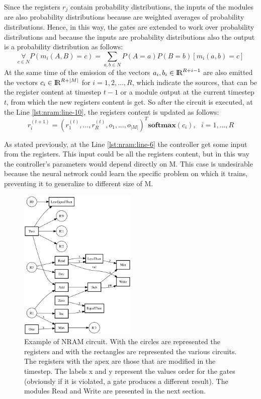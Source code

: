 Since the registers $r_j$ contain probability distributions, the inputs of the modules are also probability distributions because are weighted averages of probability distributions. Hence, in this way, the gates are extended to work over probability distributions and because the inputs are probability distributions also the output is a probability distribution as follows:
\begin{equation}
	\mathop{\forall}\limits_{c \in N} P(m_i(A, B) = c) = \sum\limits_{a,b \in N} P(A = a)P(B = b)[m_i(a, b) = c]
\end{equation}
At the same time of the emission of the vectors $a_{i}, b_{i} \in \textrm{I\!R}^{R+i-1}$ are also emitted the vectors $c_i \in \textrm{I\!R}^{R+|M|}$ for $i = 1, 2, \dots, R$, which indicate the sources, that can be the register content at timestep $t-1$ or a module output at the current timestep $t$, from which the new registers content is get. So after the circuit is executed, at the Line \ref{lst:nram:line-10}, the registers content is updated as follows:
\begin{equation}
	r_i^{(t + 1)} = (r_1^{(t)}, \dots, r_R^{(t)}, o_1, \dots, o_{|M|})^T\textbf{softmax}(c_i),\ \ \ i = 1,\dots,R
\end{equation}

As stated previously, at the Line \ref{lst:nram:line-6} the controller get some input from the registers. This input could be all the registers content, but in this way the controller's parameters would depend directly on M. This case is undesirable because the neural network could learn the specific problem on which it trains, preventing it to generalize to different size of M. 

\begin{figure}
	\centering
	\includegraphics[width=0.5\textwidth]{figures/circuit.png}
	\caption{Example of NRAM circuit. With the circles are represented the registers and with the rectangles are represented the various circuits. The registers with the apex are those that are modified in the timestep. The labels x and y represent the values order for the gates (obviously if it is violated, a gate produces a different result). The modules Read and Write are presented in the next section.}
	\label{fig:example-circuit}
\end{figure}

